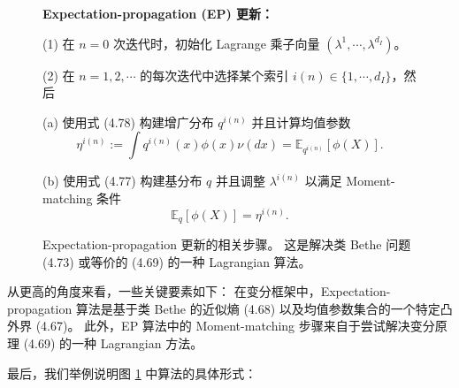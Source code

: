 \begin{figure}[htbp]
    \textbf{Expectation-propagation (EP) 更新：}
    
    (1) 在 $n = 0$ 次迭代时，初始化 Lagrange 乘子向量 $(\lambda^1, \cdots, \lambda^{d_I})$。 
    
    (2) 在 $n = 1, 2, \cdots$ 的每次迭代中选择某个索引 $i(n) \in \{1, \cdots, d_I\}$，然后
        
    \quad (a) 使用式 (4.78) 构建增广分布 $q^{i(n)}$ 并且计算均值参数
        \begin{equation}
            \eta^{i(n)} := \int q^{i(n)}(x)\phi(x)\nu(dx) = \mathbb{E}_{q^{i(n)}}[\phi(X)].
        \end{equation}
    
    \quad (b) 使用式 (4.77) 构建基分布 $q$ 并且调整 $\lambda^{i(n)}$ 以满足 Moment-matching 条件
        \begin{equation}
            \mathbb{E}_q[\phi(X)] = \eta^{i(n)}.
        \end{equation}
    \caption{
        Expectation-propagation 更新的相关步骤。
        这是解决类 Bethe 问题 (4.73) 或等价的 (4.69) 的一种 Lagrangian 算法。
    }\label{fig:4-7}
\end{figure}

从更高的角度来看，一些关键要素如下：
在变分框架中，Expectation-propagation 算法是基于类 Bethe 的近似熵 (4.68) 以及均值参数集合的一个特定凸外界 (4.67)。
此外，EP 算法中的 Moment-matching 步骤来自于尝试解决变分原理 (4.69) 的一种 Lagrangian 方法。

最后，我们举例说明图 \ref{fig:4-7} 中算法的具体形式：

